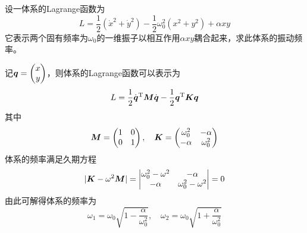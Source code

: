\begin{question}[209页6.14]
设一体系的Lagrange函数为
\begin{equation*}
	L = \frac12 (\dot{x}^2+\dot{y}^2) - \frac12 \omega_0^2 (x^2+y^2) + \alpha xy
\end{equation*}
它表示两个固有频率为$\omega_0$的一维振子以相互作用$\alpha xy$耦合起来，求此体系的振动频率。
\end{question}
\begin{solution}
记$\boldsymbol{q} = \begin{pmatrix} x \\ y \end{pmatrix}$，则体系的Lagrange函数可以表示为
\begin{equation*}
	L = \frac12 \dot{\boldsymbol{q}}^{\mathrm{T}} \boldsymbol{M} \dot{\boldsymbol{\boldsymbol{q}}} - \frac12 \boldsymbol{q}^{\mathrm{T}} \boldsymbol{K} \boldsymbol{q}
\end{equation*}
其中
\begin{equation*}
	\boldsymbol{M} = \begin{pmatrix} 1 & 0 \\ 0 & 1 \end{pmatrix},\quad \boldsymbol{K} = \begin{pmatrix} \omega_0^2 & -\alpha \\ -\alpha & \omega_0^2 \end{pmatrix}
\end{equation*}
体系的频率满足久期方程
\begin{equation*}
	|\boldsymbol{K}-\omega^2 \boldsymbol{M}| = \begin{vmatrix} \omega_0^2-\omega^2 & -\alpha \\ -\alpha & \omega_0^2-\omega^2 \end{vmatrix} = 0
\end{equation*}
由此可解得体系的频率为
\begin{equation*}
	\omega_1 = \omega_0 \sqrt{1-\frac{\alpha}{\omega_0^2}},\quad \omega_2 = \omega_0 \sqrt{1+\frac{\alpha}{\omega_0^2}}
\end{equation*}
\end{solution}

